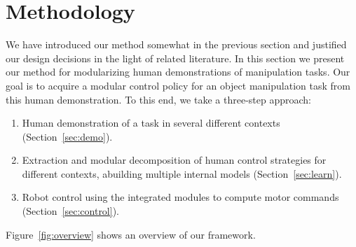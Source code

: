 \section{Methodology}
\label{sec:method}

We have introduced our method somewhat in the previous section and
justified our design decisions in the light of related literature.  In
this section we present our method for modularizing human
demonstrations of manipulation tasks. Our goal is to acquire a modular
control policy for an object manipulation task from this human
demonstration. To this end, we take a three-step approach:
\begin{enumerate}
\item Human demonstration of a task in several different contexts (Section~\ref{sec:demo}).
\item Extraction and modular decomposition of human control strategies
  for different contexts, abuilding multiple internal models
  (Section~\ref{sec:learn}).
\item Robot control using the integrated modules to compute motor
  commands (Section~\ref{sec:control}).
\end{enumerate}
Figure~\ref{fig:overview} shows an overview of our framework.

